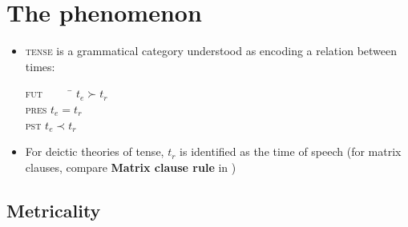 \documentclass[11pt,dvipsnames]{article}
\begin{document}
\section*{The phenomenon}
\begin{itemize}


\item \textsc{tense} is a grammatical category understood as encoding a relation between times:


\begin{tabbing}
\textsc{fut} ~~~~ \= $ t_e\succ t_r $\\
\textsc{pres} \> $t_e=t_r$\\
\textsc{pst} \>  $ t_e\prec t_r$
\end{tabbing}

\item  For deictic theories of tense, $ t_r $ is identified as the time of speech (for matrix clauses, compare \textbf{Matrix clause rule} in \citealp[270]{Tonhauser2011})

\end{itemize}


\subsection*{Metricality}
\end{document}
